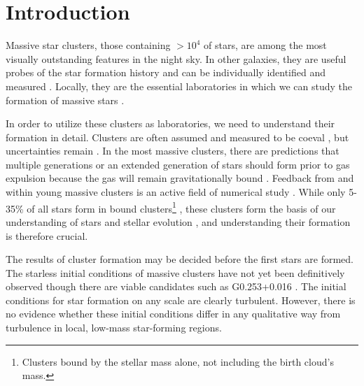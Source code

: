 

\maketitle

\section{Introduction}

Massive star clusters, those containing $>10^4$ \msun of stars, are among the
most visually outstanding features in the night sky.  In other galaxies, they
are useful probes of the star formation history and can be individually
identified and measured \citep{Bastian2008a}.  Locally, they are the essential
laboratories in which we can study the formation of massive stars
\citep{Davies2012a}.

In order to utilize these clusters as laboratories, we need to understand their
formation in detail.  Clusters are often assumed and measured to be coeval
,
but uncertainties remain \citep{Beccari2010a}.
In the most massive clusters, there are predictions that multiple generations
or an extended generation of stars should form prior to gas expulsion because
the gas will remain gravitationally bound \citep{Bressert2012a}.   Feedback from
and within young massive clusters is an active field of numerical study
\citep{Rogers2013a,Dale2013a,Dale2012a,Dale2008a,Dale2005a,Parker2013a,Myers2014a,Krumholz2014a}.
While
only 5-35\% of all stars form in bound clusters\footnote{Clusters bound by the
stellar mass alone, not including the birth cloud's mass.}
\citep{Kruijssen2012a}, these clusters form the basis of our understanding of
stars and stellar evolution
\citep{Kalirai2010a}, and understanding their formation is therefore crucial.

The results of cluster formation may be decided before the first stars are
formed.  The starless initial conditions of massive clusters have not yet been
definitively observed \citep{Ginsburg2012a} though there are viable candidates
such as G0.253+0.016 \citep{Longmore2012b}.  The initial conditions for star
formation on any scale are clearly turbulent.  However, there is no evidence
whether these initial conditions differ in any qualitative way from turbulence
in local, low-mass star-forming regions.

